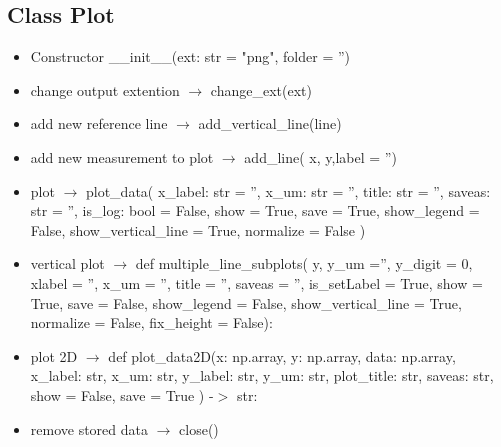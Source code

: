 \documentclass{article}
\begin{document}
\subsection{Class Plot}
\begin{itemize}
\item Constructor \_\_init\_\_(ext: str = "png", folder = '')
\item change output extention $\rightarrow$ change\_ext(ext)
\item add new reference line $\rightarrow$ add\_vertical\_line(line)
\item add new measurement to plot $\rightarrow$ add\_line( x, y,label = '')
\item plot $\rightarrow$ plot\_data(
             x\_label: str = '',
             x\_um: str = '',
             title: str = '',
             saveas: str = '',
             is\_log: bool = False,
             show = True,
             save = True,
             show\_legend = False,
             show\_vertical\_line = True,
             normalize = False
             )
\item vertical plot $\rightarrow$     def multiple\_line\_subplots( y, y\_um ='', y\_digit = 0,
                                    xlabel = '', x\_um = '',
                                    title = '', saveas = '',
                                    is\_setLabel = True, show = True, 
                                    save = False, show\_legend = False,
                                     show\_vertical\_line = True,
                                     normalize = False, fix\_height = False):          
\item plot 2D $\rightarrow$     def plot\_data2D(x: np.array,
             y: np.array,
             data: np.array,
             x\_label: str,
             x\_um: str,
             y\_label: str,
             y\_um: str,
             plot\_title: str,
             saveas: str,
             show = False,
             save = True ) -$>$ str:
\item remove stored data $\rightarrow$ close()             	
\end{itemize}
\printbibliography
\end{document}

